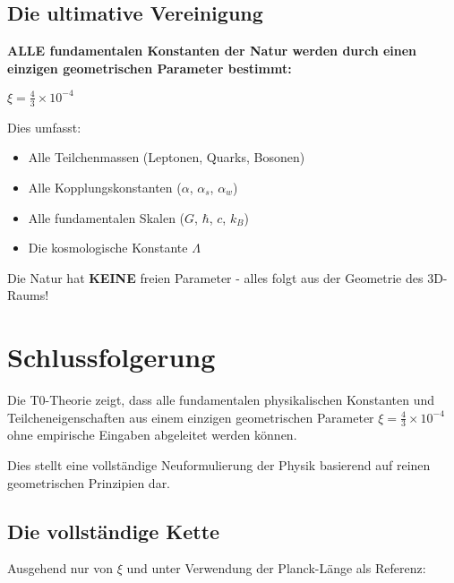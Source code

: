 \documentclass[12pt,a4paper]{article}
\newcommand{\xipar}{\xi}
\begin{document}
	\subsection{Die ultimative Vereinigung}
	
	\begin{tcolorbox}[colback=red!5, colframe=red!75!black, title=Revolutionäres Ergebnis]
		\textbf{ALLE fundamentalen Konstanten der Natur werden durch einen einzigen geometrischen Parameter bestimmt:}
		
		$\xipar = \frac{4}{3} \times 10^{-4}$
		
		Dies umfasst:
		\begin{itemize}
			\item Alle Teilchenmassen (Leptonen, Quarks, Bosonen)
			\item Alle Kopplungskonstanten ($\alpha$, $\alpha_s$, $\alpha_w$)
			\item Alle fundamentalen Skalen ($G$, $\hbar$, $c$, $k_B$)
			\item Die kosmologische Konstante $\Lambda$
		\end{itemize}
		
		Die Natur hat \textbf{KEINE} freien Parameter - alles folgt aus der Geometrie des 3D-Raums!
	\end{tcolorbox}
	
	\section{Schlussfolgerung}
	
	\begin{tcolorbox}[colback=green!5, colframe=green!75!black, title=Zentrales Ergebnis]
		Die T0-Theorie zeigt, dass alle fundamentalen physikalischen Konstanten und Teilcheneigenschaften aus einem einzigen geometrischen Parameter $\xipar = \frac{4}{3} \times 10^{-4}$ ohne empirische Eingaben abgeleitet werden können.
		
		Dies stellt eine vollständige Neuformulierung der Physik basierend auf reinen geometrischen Prinzipien dar.
	\end{tcolorbox}
	
	\subsection{Die vollständige Kette}
	
	Ausgehend nur von $\xipar$ und unter Verwendung der Planck-Länge als Referenz:
	
\end{document}
